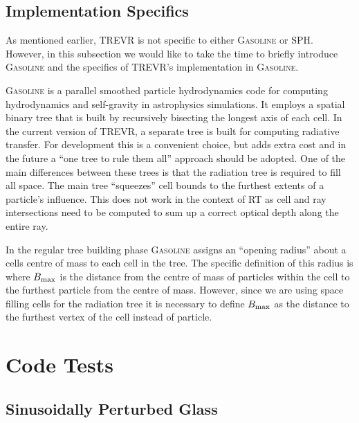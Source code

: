 \documentclass[fleq,usenatbib]{mnras}
\newcommand{\acro}{TREVR}
\begin{document}
\subsection{Implementation Specifics}\label{sec:specs}
As mentioned earlier, \acro{} is not specific to either \textsc{Gasoline} or 
SPH. However, in this subsection we would like to take the time to briefly  
introduce \textsc{Gasoline} and the specifics of \acro{}'s implementation in 
\textsc{Gasoline}.

\textsc{Gasoline} is a parallel smoothed particle hydrodynamics code for 
computing hydrodynamics and self-gravity in astrophysics simulations. It 
employs a spatial binary tree that is built by recursively bisecting the 
longest axis of each cell. In the current version of \acro{}, a separate tree 
is built for computing radiative transfer. For development this is a 
convenient choice, but adds extra cost and in the future a ``one tree to rule 
them all'' approach should be adopted. One of the main differences between 
these trees is that the radiation tree is required to fill all space. The main 
tree ``squeezes'' cell bounds to the furthest extents of a particle's 
influence. This does not work in the context of RT as cell and ray 
intersections need to be computed to sum up a correct optical depth along 
the entire ray.

In the regular tree building phase \textsc{Gasoline} assigns an ``opening 
radius'' about a cells centre of mass to each cell in the tree. The specific 
definition of this radius is 
where $B_{\rm max}$ is the  distance from the centre of mass of particles 
within the cell to the furthest particle from the centre of mass. However, 
since we are using space filling cells for the radiation tree it is necessary 
to define $B_{\rm max}$ as the distance to the furthest vertex of the cell 
instead of particle.

\section{Code Tests}\label{sec:tsts}
\subsection{Sinusoidally Perturbed Glass}
\end{document}
